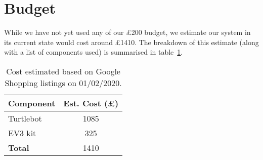 \documentclass{article}
\begin{document}
\section{Budget}
While we have not yet used any of our \pounds 200 budget, we estimate our system in its current state would cost around \pounds 1410. The breakdown of this estimate (along with a list of components used) is summarised in table~\ref{tab:budget}.

\begin{table}[h]
\vskip 3mm
\begin{center}
\begin{sc}
\begin{tabular}{lc}
\hline
\abovespace\belowspace
Component & Est. Cost (\pounds) \\
\hline
  Turtlebot & 1085 \\
  EV3 kit & 325 \\ \hline
  {\bf Total} & 1410
\end{tabular}
\end{sc}
\caption{Cost estimated based on Google Shopping listings on 01/02/2020.}
\label{tab:budget}
\end{center}
\vskip -3mm
\end{table}



\end{document}
